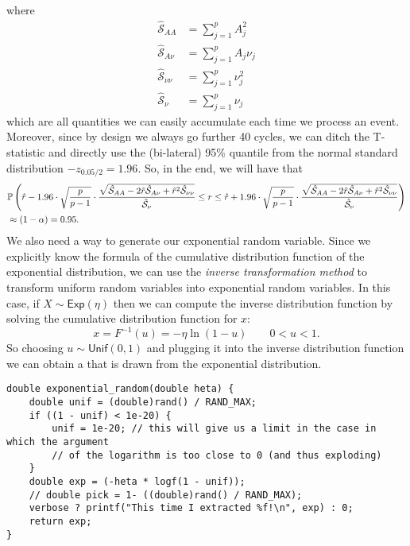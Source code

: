 \documentclass[12pt]{article}
\begin{document}
where
\begin{align*}
	\hat{\mathcal{S}}_{AA}&=\sum_{j=1}^{p}A^{2}_{j}\\
	\hat{\mathcal{S}}_{A\nu}&=\sum_{j=1}^{p}A_j\nu_j\\
	\hat{\mathcal{S}}_{\nu\nu}&=\sum_{j=1}^{p}\nu_j^2\\
	\hat{\mathcal{S}}_{\nu}&=\sum_{j=1}^{p}\nu_j
\end{align*}
which are all quantities we can easily accumulate each time we process an event. Moreover, since by design we always go further 40 cycles, we can ditch the T-statistic and directly use the (bi-lateral) 95\% quantile from the normal standard distribution $-z_{0.05/2}=1.96$. So, in the end, we will have that
\begin{align*}
	&\mathbb{P}\left(\hat{r}-1.96\cdot\sqrt{\frac{p}{p-1}}\cdot\frac{\sqrt{\hat{\mathcal{S}}_{AA}-2\hat{r}\hat{\mathcal{S}}_{A\nu}+\hat{r}^{2}\hat{\mathcal{S}}_{\nu\nu}}}{\hat{\mathcal{S}}_{\nu}}\leq r\leq\hat{r}+1.96\cdot\sqrt{\frac{p}{p-1}}\cdot\frac{\sqrt{\hat{\mathcal{S}}_{AA}-2\hat{r}\hat{\mathcal{S}}_{A\nu}+\hat{r}^{2}\hat{\mathcal{S}}_{\nu\nu}}}{\hat{\mathcal{S}}_{\nu}} \right)\\
	&\approx(1-\alpha)=0.95.
\end{align*}
We also need a way to generate our exponential random variable. Since we explicitly know the formula of the cumulative distribution function of the exponential distribution, we can use the \emph{inverse transformation method} to transform uniform random variables into exponential random variables. In this case, if $X\sim\mathsf{Exp}(\eta)$ then we can compute the inverse distribution function by solving the cumulative distribution function for $x$:
\begin{equation*}
	x=F^{-1}(u)=-\eta\ln(1-u)\qquad0<u<1.
\end{equation*}
So choosing $u\sim\mathsf{Unif}(0,1)$ and plugging it into the inverse distribution function we can obtain a \rv{} that is drawn from the exponential distribution.
\begin{lstlisting}
double exponential_random(double heta) {
	double unif = (double)rand() / RAND_MAX;
	if ((1 - unif) < 1e-20) {
		unif = 1e-20; // this will give us a limit in the case in which the argument
		// of the logarithm is too close to 0 (and thus exploding)
	}
	double exp = (-heta * logf(1 - unif));
	// double pick = 1- ((double)rand() / RAND_MAX);
	verbose ? printf("This time I extracted %f!\n", exp) : 0;
	return exp;
}
\end{lstlisting}
\end{document}
